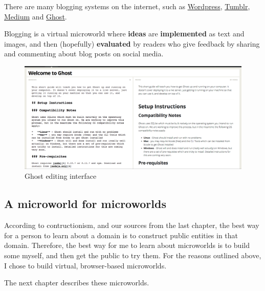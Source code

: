 There are many blogging systems on the internet, such as \href{http://wordpress.org/}{Wordpress}, \href{http://tumblr.com}{Tumblr}, \href{http://medium.com}{Medium} and \href{http://ghost.org}{Ghost}. 

Blogging is a virtual microworld where \textbf{ideas} are \textbf{implemented} as text and images, and then (hopefully) \textbf{evaluated} by readers who give feedback by sharing and commenting about blog posts on social media. 

\begin{figure}[ht!]
\centering
\includegraphics[width=123mm]{img/ghost.png}
\caption{Ghost editing interface}
\label{overflow}
\end{figure}

\subsection{A microworld for microworlds}

According to contructionism, and our sources from the last chapter, the best way for a person to learn about a domain is to construct public entities in that domain. Therefore, the best way for me to learn about microworlds is to build some myself, and then get the public to try them. For the reasons outlined above, I chose to build virtual, browser-based microworlds. 

The next chapter describes these microworlds. 
